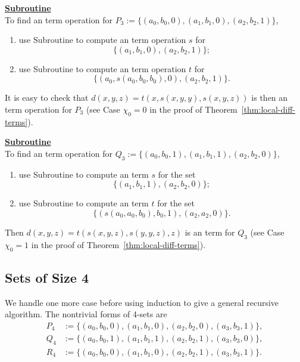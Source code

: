 \noindent \underline{\textbf{Subroutine }}\\[4pt]
To find an \ld term operation for
$P_3:=\{(a_0, b_0, 0), (a_1, b_1, 0),  (a_2, b_2, 1)\}$,
\begin{enumerate}
\item use Subroutine  to compute an \ld term operation $s$ for
\begin{equation*}
\{(a_1, b_1, 0), (a_2, b_2, 1)\}; 
\end{equation*}
\item use Subroutine  to compute an \ld term operation $t$ for
\begin{equation*}
\{(a_0, s(a_0, b_0, b_0), 0), (a_2, b_2, 1)\}.
\end{equation*}
\end{enumerate}
It is easy to check that
$d(x,y,z) = t(x, s(x,y,y), s(x,y,z))$
is then an \ld term operation for $P_3$ 
(see Case $\chi_0=0$ in the proof of Theorem~\ref{thm:local-diff-terms}).


\noindent \underline{\textbf{Subroutine }}\\[4pt]
To find an \ld term operation for 
$Q_3 := \{(a_0, b_0, 1), (a_1, b_1, 1), (a_2, b_2, 0)\}$,
\begin{enumerate}
\item \label{item:001-1}
use Subroutine  to compute an \ld term $s$ for the set
\begin{equation*}
\{(a_1, b_1, 1), (a_2, b_2, 0)\};
\end{equation*}
\item \label{item:001-2} use Subroutine  to compute an \ld term $t$
for the set
\begin{equation*}
\{(s(a_0, a_0, b_0), b_0, 1),  (a_2,a_2,0)\}.
\end{equation*}
\end{enumerate}
Then 
$d(x,y,z) = t(s(x,y,z), s(y,y,z),z)$
is an \ld term  for $Q_3$ (see Case $\chi_0=1$ in the proof of Theorem~\ref{thm:local-diff-terms}).

\subsection{Sets of Size 4} We handle one more case before 
using induction to give a general recursive algorithm.
The nontrivial forms of 4-sets are
\begin{align*}
P_4 &:= \{(a_0, b_0, 0), (a_1, b_1, 0),  (a_2, b_2, 0),  (a_3, b_3, 1)\},\\ 
Q_4 &:= \{(a_0, b_0, 1), (a_1, b_1, 1), (a_2, b_2, 1), (a_3, b_3, 0)\},\\
R_4 &:= \{(a_0, b_0, 0), (a_1, b_1, 0),  (a_2, b_2, 1),  (a_3, b_3, 1)\}.
\end{align*}

